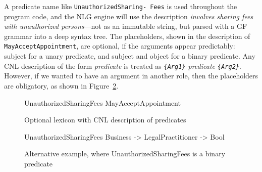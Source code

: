 \documentclass[11pt]{article}
\begin{document}
A predicate name like {\small \texttt{UnauthorizedSharing- Fees}} is used throughout the program code, and the NLG engine will use the description \textit{involves sharing fees with unauthorized persons}---not as an immutable string, but parsed with a GF grammar
into a deep syntax tree. 
The placeholders, shown in the description of {\small \texttt{MayAcceptAppointment}}, are optional, if the arguments appear predictably: subject for a unary predicate, and subject and object for a binary predicate. Any CNL description of the form \textit{predicate} is treated as \textit{{\small \texttt{\{Arg1\}} } predicate {\small \texttt{\{Arg2\}}}}.
However, if we wanted to have an argument in another role, then the placeholders are obligatory, as shown in Figure~\ref{fig:unauthorizedSharingFees}. 



\begin{figure}[t]
\begin{Shaded}
\begin{Highlighting}[]
  UnauthorizedSharingFees 
    
  MayAcceptAppointment 
    
\end{Highlighting}
\end{Shaded}
\caption{Optional lexicon with CNL description of predicates}
\label{fig:optionalLexicon}
\end{figure}

\begin{figure}[b]

\begin{Shaded}
\begin{Highlighting}[]
  UnauthorizedSharingFees 
   \KeywordTok{:} Business
     -> LegalPractitioner 
     -> Bool
    
\end{Highlighting}
\end{Shaded}
\caption{Alternative example, where UnauthorizedSharingFees is a binary predicate}
\label{fig:unauthorizedSharingFees}
\end{figure}
\end{document}
